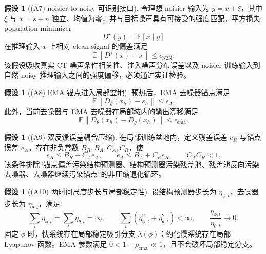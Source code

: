 \documentclass[11pt,a4paper,UTF8,fontset=fandol]{ctexart}
\theoremstyle{definition}
\newtheorem{assumption}[theorem]{假设}
\newcommand{\norm}[1]{\left\lVert#1\right\rVert}
\newcommand{\E}{\mathbb{E}}
\begin{document}
\begin{assumption}[(A7) noisier-to-noisy 可识别接口]
令理想 noisier 输入为 $y=x+\xi$，其中 $\xi$ 与 $x=s+n$ 独立、均值为零，并与目标噪声具有可接受的强度匹配。平方损失 population minimizer
\begin{equation}
    D^\star(y)=\E[x\mid y]
\end{equation}
在推理输入 $x$ 上相对 clean signal 的偏差满足
\begin{equation}
\label{eq:n2n-interface}
    \E\norm{D^\star(x)-s}\le\epsilon_{\mathrm{N2N}}.
\end{equation}
该假设吸收真实 CT 噪声条件相关性、注入噪声分布误差以及 noisier 训练输入到自然 noisy 推理输入之间的强度偏移，必须通过实证检验。
\end{assumption}

\begin{assumption}[(A8) EMA 锚点进入局部盆地]
预热后，EMA 去噪器锚点满足
\begin{equation}
\label{eq:anchor-quality}
    \E\norm{D_{\bar\theta}(x_h)-s_h}\le\epsilon_A.
\end{equation}
此外，当前去噪器与 EMA 去噪器在局部域内的输出漂移满足
\begin{equation}
    \E\norm{D_\theta(x_h)-D_{\bar\theta}(x_h)}
    \le\epsilon_{\mathrm{ema}}.
\end{equation}
\end{assumption}

\begin{assumption}[(A9) 双反馈误差耦合压缩]
在局部训练盆地内，定义残差误差 $e_R$ 与锚点误差 $e_A$。存在非负常数 $B_R,B_A,C_A,C_R$，使
\begin{equation}
\label{eq:feedback-compression}
    e_R\le B_R+C_Ae_A,
    \qquad
    e_A\le B_A+C_Re_R,
    \qquad
    C_AC_R<1.
\end{equation}
该条件排除“锚点偏差污染结构预测器、结构预测器污染残差池、残差池反向污染去噪器、去噪器继续污染锚点”的非压缩退化循环。
\end{assumption}

\begin{assumption}[(A10) 两时间尺度步长与局部稳定性]
设结构预测器步长为 $\eta_{\phi,t}$，去噪器步长为 $\eta_{\theta,t}$，满足
\begin{equation}
\label{eq:two-timescale-steps}
    \sum_t\eta_{\phi,t}=\sum_t\eta_{\theta,t}=\infty,
    \qquad
    \sum_t(\eta_{\phi,t}^2+\eta_{\theta,t}^2)<\infty,
    \qquad
    \frac{\eta_{\phi,t}}{\eta_{\theta,t}}\to0.
\end{equation}
固定 $\phi$ 时，快系统存在局部稳定吸引分支 $\lambda(\phi)$；约化慢系统存在局部 Lyapunov 函数。EMA 参数满足 $0<1-\rho_{\mathrm{ema}}\ll1$，且不会破坏局部稳定分支。
\end{assumption}
\end{document}
